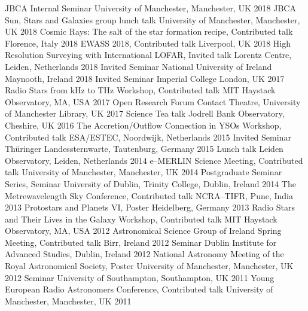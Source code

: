 \begin{cvpress}
   \cvpres
    {JBCA Internal Seminar}
    {University of Manchester, Manchester, UK}
    {2018}   
    \cvpres
    {JBCA Sun, Stars and Galaxies group lunch talk}
    {University of Manchester, Manchester, UK}
    {2018}
   \cvpres
    {Cosmic Rays: The salt of the star formation recipe, Contributed talk}
    {Florence, Italy}
    {2018}
   \cvpres
    {EWASS 2018, Contributed talk}
    {Liverpool, UK}
    {2018}
\cvpres
    {High Resolution Surveying with International LOFAR, Invited talk}
    {Lorentz Centre, Leiden, Netherlands}
    {2018}
   \cvpres
    {Invited Seminar}
    {National University of Ireland Maynooth, Ireland}
    {2018}
   \cvpres
    {Invited Seminar}
    {Imperial College London, UK}
    {2017}
   \cvpres
    {Radio Stars from kHz to THz Workshop, Contributed talk}
    {MIT Haystack Observatory, MA, USA}
    {2017}
   \cvpres
    {Open Research Forum}
    {Contact Theatre, University of Manchester Library, UK}
    {2017}
  \cvpres
  {Science Tea talk}
  {Jodrell Bank Observatory, Cheshire, UK}
  {2016}
  \cvpres
    {The Accretion/Outflow Connection in YSOs Workshop, Contributed talk}
    {ESA/ESTEC, Noordwijk, Netherlands}
    {2015}
  \cvpres
    {Invited Seminar}
    {Th{\"u}ringer Landessternwarte, Tautenburg, Germany}
    {2015}
  \cvpres
    {Lunch talk}
    {Leiden Observatory, Leiden, Netherlands}
    {2014}
  \cvpres
    {e--MERLIN Science Meeting, Contributed talk}
    {University of Manchester, Manchester, UK}
    {2014}
  \cvpres
    {Postgraduate Seminar Series, Seminar}
    {University of Dublin, Trinity College, Dublin, Ireland}
    {2014}
   \cvpres
   	{The Metrewavelength Sky Conference, Contributed talk}
    {NCRA--TIFR, Pune, India}
    {2013}
   \cvpres
   	{Protostars and Planets VI, Poster}
    {Heidelberg, Germany}
    {2013}
   \cvpres
   	{Radio Stars and Their Lives in the Galaxy Workshop, Contributed talk}
    {MIT Haystack Observatory, MA, USA}
    {2012}
   \cvpres
   	{Astronomical Science Group of Ireland Spring Meeting, Contributed talk}
    {Birr, Ireland}
    {2012}
   \cvpres
   	{Seminar}
    {Dublin Institute for Advanced Studies, Dublin, Ireland}
    {2012}
   \cvpres
   	{National Astronomy Meeting of the Royal Astronomical Society, Poster}
    {University of Manchester, Manchester, UK}
    {2012}
   \cvpres
   	{Seminar}
    {University of Southampton, Southampton, UK}
    {2011}
   \cvpres
   	{Young European Radio Astronomers Conference, Contributed talk}
    {University of Manchester, Manchester, UK}
    {2011}
\end{cvpress}

